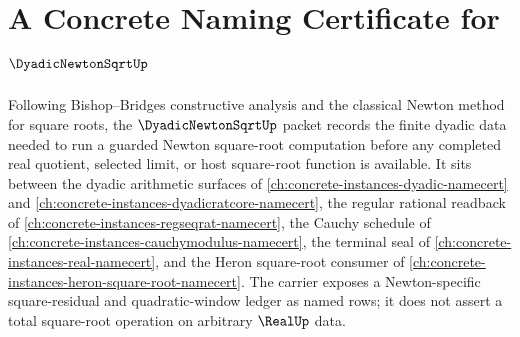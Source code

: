 \chapter{A Concrete Naming Certificate for $\DyadicNewtonSqrtUp$}
\label{ch:concrete-instances-dyadic-newton-sqrt-namecert}

Following Bishop--Bridges constructive analysis and the classical Newton method for square roots, the $\DyadicNewtonSqrtUp$ packet records the finite dyadic data needed to run a guarded Newton square-root computation before any completed real quotient, selected limit, or host square-root function is available. It sits between the dyadic arithmetic surfaces of \autoref{ch:concrete-instances-dyadic-namecert} and \autoref{ch:concrete-instances-dyadicratcore-namecert}, the regular rational readback of \autoref{ch:concrete-instances-regseqrat-namecert}, the Cauchy schedule of \autoref{ch:concrete-instances-cauchymodulus-namecert}, the terminal seal of \autoref{ch:concrete-instances-real-namecert}, and the Heron square-root consumer of \autoref{ch:concrete-instances-heron-square-root-namecert}. The carrier exposes a Newton-specific square-residual and quadratic-window ledger as named rows; it does not assert a total square-root operation on arbitrary $\RealUp$ data.

